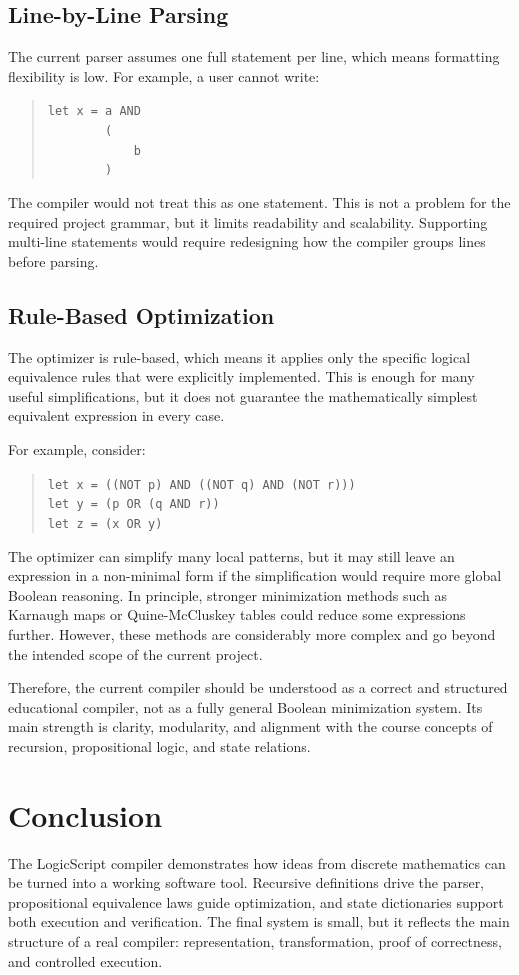 \documentclass[11pt]{article}
\begin{document}
\subsection{Line-by-Line Parsing}
The current parser assumes one full statement per line, which means formatting flexibility is low. For example, a user cannot write:
\begin{quote}
\texttt{let x = a AND}\\
\texttt{\ \ \ \ \ \ \ \ (}\\
\texttt{\ \ \ \ \ \ \ \ \ \ \ \ b}\\
\texttt{\ \ \ \ \ \ \ \ )}
\end{quote}
The compiler would not treat this as one statement. This is not a problem for the required project grammar, but it limits readability and scalability. Supporting multi-line statements would require redesigning how the compiler groups lines before parsing.

\subsection{Rule-Based Optimization}
The optimizer is rule-based, which means it applies only the specific logical equivalence rules that were explicitly implemented. This is enough for many useful simplifications, but it does not guarantee the mathematically simplest equivalent expression in every case.

For example, consider:
\begin{quote}
\texttt{let x = ((NOT p) AND ((NOT q) AND (NOT r)))}\\
\texttt{let y = (p OR (q AND r))}\\
\texttt{let z = (x OR y)}
\end{quote}
The optimizer can simplify many local patterns, but it may still leave an expression in a non-minimal form if the simplification would require more global Boolean reasoning. In principle, stronger minimization methods such as Karnaugh maps or Quine-McCluskey tables could reduce some expressions further. However, these methods are considerably more complex and go beyond the intended scope of the current project.

Therefore, the current compiler should be understood as a correct and structured educational compiler, not as a fully general Boolean minimization system. Its main strength is clarity, modularity, and alignment with the course concepts of recursion, propositional logic, and state relations.

\section{Conclusion}
The LogicScript compiler demonstrates how ideas from discrete mathematics can be turned into a working software tool. Recursive definitions drive the parser, propositional equivalence laws guide optimization, and state dictionaries support both execution and verification. The final system is small, but it reflects the main structure of a real compiler: representation, transformation, proof of correctness, and controlled execution.
\end{document}
